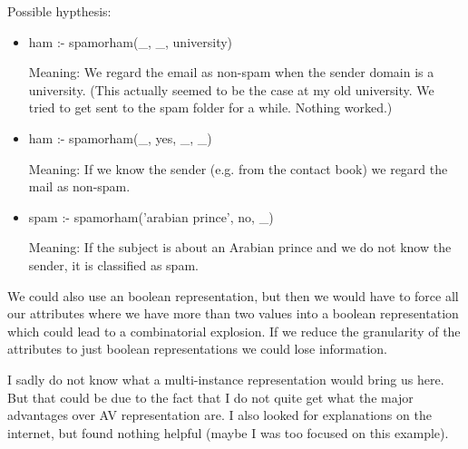 \documentclass[a4paper]{article}
\begin{document}
\medskip
Possible hypthesis:
\begin{itemize}
\item ham :- spamorham(\_, \_, university) 

Meaning: We regard the email as non-spam when the sender domain is a university. (This actually seemed to be the case at my old university. We tried to get sent to the spam folder for a while. Nothing worked.)
\item ham :- spamorham(\_, yes, \_, \_)

Meaning: If we know the sender (e.g. from the contact book) we regard the mail as non-spam.
\item spam :- spamorham('arabian prince', no, \_)

Meaning: If the subject is about an Arabian prince and we do not know the sender, it is classified as spam.
\end{itemize}

We could also use an boolean representation, but then we would have to force all our attributes where we have more than two values into a boolean representation which could lead to a combinatorial explosion. If we reduce the granularity of the attributes to just boolean representations we could lose information.

I sadly do not know what a multi-instance representation would bring us here. But that could be due to the fact that I do not quite get what the major advantages over AV representation are. I also looked for explanations on the internet, but found nothing helpful (maybe I was too focused on this example).
\end{document}

